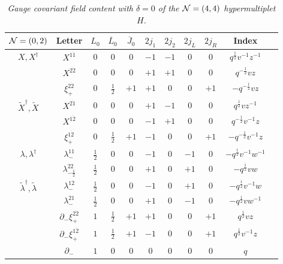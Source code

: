 \documentclass[main.tex]{subfiles}
\begin{document}
\begin{table}
\centering
 \begin{tabular}{|c|c|c|c|c|c|c|c|c|c|c|} 
 \hline
$\mathcal{N}=(0,2)$ &Letter & $L_0$&$\overline{L}_0$& $\overline{J}_0$ &$2j_1$&$2j_2$& $2j_L$&$2j_R$& Index\\\hline
\hline
\multirow{ 3}{*}{$X,X^{\dagger}$}&$X^{1\dot1}$&$0$ &$0$ & $0$& $-1$&$-1$&$0$ & $0$& $q^{\frac{1}{2}}v^{-1}z^{-1}$\\\cline{2-10}
&$X^{2\dot2}$ &$0$&$0$ & $0$& $+1$&$+1$&$0$&$0$ & $q^{-\frac{1}{2}}vz$\\\cline{2-10}
&$\xi_{+}^{2\dot2}$ &$0$&$\frac{1}{2}$ & $+1$&$+1$&$0$ & $0$& $+1$ &$-q^{-\frac{1}{2}}vz$\\\hline
\multirow{ 3}{*}{$\tilde{X}^{\dagger},\tilde{X}$}&$X^{2\dot1}$ &$0$&$0$ & $0$&$+1$&$-1$& $0$&$0$ & $q^{\frac{1}{2}}vz^{-1}$\\\cline{2-10}
&$X^{1\dot2}$&$0$ &$0$ & $0$&$-1$&$+1$& $0$ & $0$&$q^{-\frac{1}{2}}v^{-1}z$\\\cline{2-10}
&$\xi_{+}^{1\dot2}$&$0$ &$\frac{1}{2}$ & $+1$ &$-1$&$0$& $0$&$+1$& $-q^{-\frac{1}{2}}v^{-1}z$\\\hline
\multirow{ 2}{*}{$\lambda,\lambda^{\dagger}$} &$\lambda_{-}^{11}$ &$\frac{1}{2}$&$0$ & $0$ &$-1$&$0$& $-1$ &$0$& $-q^{\frac{1}{2}}v^{-1}w^{-1}$\\\cline{2-10}
&$\lambda_{-\frac{1}{2}}^{22}$&$\frac{1}{2}$ &$0$ & $0$ & $+1$&$0$&$+1$ & $0$ &$-q^{\frac{1}{2}}vw$\\\hline
\multirow{ 2}{*}{$\tilde{\lambda}^{\dagger},\tilde{\lambda}$}&$\lambda_{-}^{12}$ &$\frac{1}{2}$&$0$ & $0$&$-1$& $0$& $+1$ & $0$&$-q^{\frac{1}{2}}v^{-1}w$\\\cline{2-10}
&$\lambda_{-}^{21}$ &$\frac{1}{2}$&$0$ & $0$ &$+1$&$0$& $-1$ & $0$ & $-q^{\frac{1}{2}}vw^{-1}$\\\hline
\hline
\multirow{ 2}{*}{}&$\partial_-\xi_{+}^{2\dot2}$ &$1$&$\frac{1}{2}$ & $+1$ &$+1$&$0$& $0$& $+1$&$q^{\frac{1}{2}}vz$\\\cline{2-10}
&$\partial_-\xi_{+}^{1\dot2}$&$1$ &$\frac{1}{2}$ & $+1$ &$-1$&$0$& $0$&$+1$& $q^{\frac{1}{2}}v^{-1}z$\\\hline
\hline
&$\partial_{-}$&$1$ &$0$ &$0$& $0$ &$0$&$0$&$0$& $q$\\\hline
\end{tabular}
\caption{\it Gauge covariant field content with $\delta=0$ of the $\mathcal{N}=(4,4)$ hypermultiplet $H$.}
 \label{tab:Hletters}
\end{table}
\end{document}
